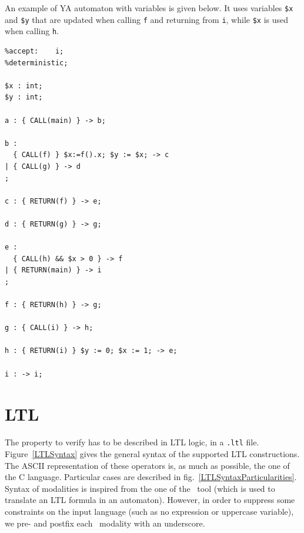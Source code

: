 \documentclass{report}
\begin{document}
An example of YA automaton with variables is given below. It uses variables \lstinline|$x| and
\lstinline|$y| that are updated when calling \lstinline|f| and returning from \lstinline|i|,
while \lstinline|$x| is used when calling \lstinline|h|.%

\begin{lstlisting}[language=ya]
%init:		a;
%accept:	i;
%deterministic;

$x : int;
$y : int;

a : { CALL(main) } -> b;

b :
  { CALL(f) } $x:=f().x; $y := $x; -> c
| { CALL(g) } -> d
;

c : { RETURN(f) } -> e;

d : { RETURN(g) } -> g;

e :
  { CALL(h) && $x > 0 } -> f
| { RETURN(main) } -> i
;

f : { RETURN(h) } -> g;

g : { CALL(i) } -> h;

h : { RETURN(i) } $y := 0; $x := 1; -> e;

i : -> i;
\end{lstlisting}

\section{LTL}
\label{sec:ltl}
The property to verify has to be described in LTL logic, in a
\texttt{.ltl} file. Figure~\ref{LTLSyntax} gives the general syntax of
the supported LTL constructions. The ASCII representation of these
operators is, as much as possible, the one of the C
language. Particular cases are described in
fig.~\ref{LTLSyntaxParticularities}. Syntax of modalities is inspired
from the one of the \ltltoba\ tool (which is used to translate an LTL
formula in an automaton). However, in order to suppress some constraints on
the input language (such as no expression or uppercase variable), we pre- and
postfix each \ltltoba\ modality with an underscore.
\end{document}

